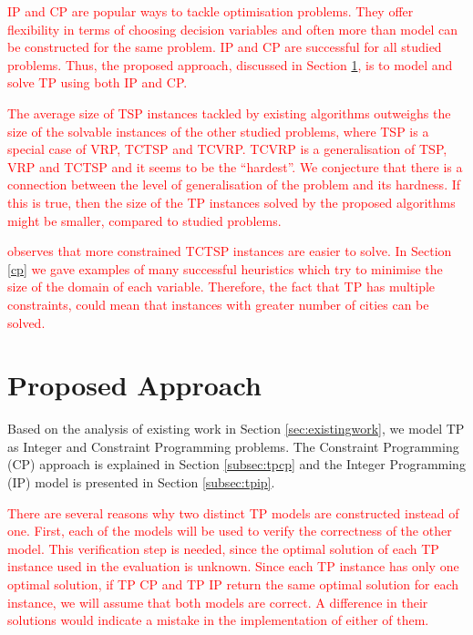 \documentclass{mprop}
\theoremstyle{definition}
\begin{document}
\textcolor{red}{
IP and CP are popular ways to tackle optimisation problems. They offer flexibility in terms of choosing decision variables and often more than model can be constructed for the same problem. IP and CP are successful for all studied problems. Thus, the proposed approach, discussed in Section \ref{sec:proposedapproach}, is to model and solve TP using both IP and CP.}

\textcolor{red}{
The average size of TSP instances tackled by existing algorithms outweighs the size of the solvable instances of the other studied problems, where TSP is a special case of VRP, TCTSP and TCVRP. TCVRP is a generalisation of TSP, VRP and TCTSP and it seems to be the ``hardest''. We conjecture that there is a connection between the level of generalisation of the problem and its hardness. If this is true, then the size of the TP instances solved by the proposed algorithms might be  smaller, compared to studied problems.}

\textcolor{red}{
\citet{Baker83} observes that more constrained TCTSP instances are easier to solve. In Section \ref{cp} we gave examples of many successful heuristics which try to minimise the size of the domain of each variable. Therefore, the fact that TP has multiple constraints, could mean that instances with greater number of cities can be solved.}

\section{Proposed Approach}
\label{sec:proposedapproach}
Based on the analysis of existing work in Section \ref{sec:existingwork}, we model TP as Integer and Constraint Programming problems. The Constraint Programming (CP) approach is explained in Section \ref{subsec:tpcp} and the Integer Programming (IP) model is presented in Section \ref{subsec:tpip}.

\textcolor{red}{
There are several reasons why two distinct TP models are constructed instead of one. First, each of the models will be used to verify the correctness of the other model. This verification step is needed, since the optimal solution of each TP instance used in the evaluation is unknown. Since each TP instance has only one optimal solution, if TP CP and TP IP return the same optimal solution for each instance, we will assume that both models are correct. A difference in their solutions would indicate a mistake in the implementation of either of them.}
\end{document}
